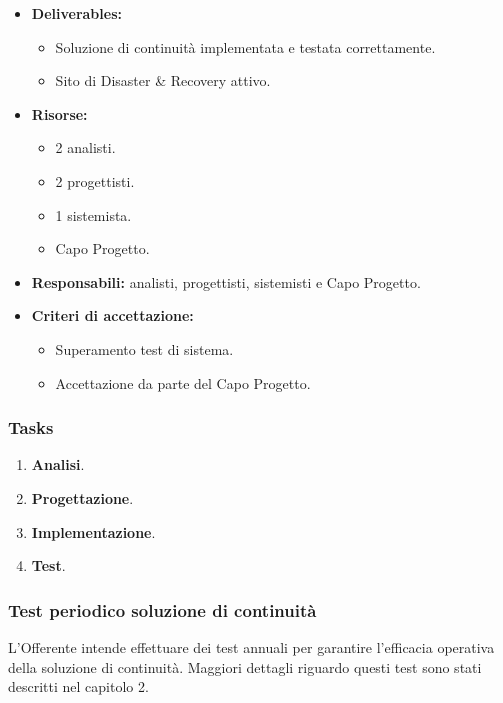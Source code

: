                 \begin{itemize}
               		\item  \textbf{Deliverables:} 
                    \begin{itemize}
                    	\item Soluzione di continuità implementata e testata correttamente.
                        \item Sito di Disaster \& Recovery attivo.
					\end{itemize}    
                    \item  \textbf{Risorse:} 
                	\begin{itemize}
                		\item 2 analisti.
                        \item 2 progettisti.
                        \item 1 sistemista.
                        \item Capo Progetto.
                	\end{itemize}
                    \item  \textbf{Responsabili:} analisti, progettisti, sistemisti e Capo Progetto.
                    \item  \textbf{Criteri di accettazione:} 
                    \begin{itemize}
                    	\item Superamento test di sistema.
                    	\item Accettazione da parte del Capo Progetto.
                    \end{itemize}
                	\end{itemize}
                    
					\subsubsection*{Tasks}
                    \begin{enumerate}
                    	\item \textbf{Analisi}.
                        \item \textbf{Progettazione}.
                        \item \textbf{Implementazione}.
                        \item \textbf{Test}.
                    \end{enumerate}
                    
			\subsubsection{Test periodico soluzione di continuità}
            	L'Offerente intende effettuare dei test annuali per garantire l'efficacia operativa della soluzione di continuità. Maggiori dettagli riguardo questi test sono stati descritti nel capitolo 2. 
                
